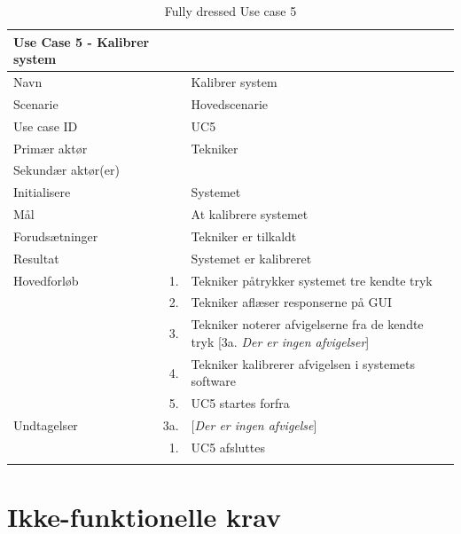 
\begin{longtabu} to 
\toprule
    {\large \textbf{Use Case 5 - Kalibrer system}} && \\
    \toprule
    Navn &&    Kalibrer system\\
    Scenarie &&    Hovedscenarie\\
    Use case ID &&    UC5\\
    Primær aktør &&    Tekniker\\
    Sekundær aktør(er) &&    \\
    Initialisere &&    Systemet\\
    Mål &&    At kalibrere systemet\\
    Forudsætninger &&    Tekniker er tilkaldt\\
    Resultat &&    Systemet er kalibreret\\
    \toprule
    Hovedforløb &    1. &    Tekniker påtrykker systemet tre kendte tryk\\[-1ex]
                &    2. &   Tekniker aflæser responserne på GUI\\[-1ex]
                &    3. &    Tekniker noterer afvigelserne fra de kendte tryk\newline
                             [3a. \textit{Der er ingen afvigelser}]\\[-1ex]
                &    4. &   Tekniker kalibrerer afvigelsen i systemets software\\[-1ex]
               &	5.	&	UC5 startes forfra\\[-1ex]
    \toprule
    Undtagelser &    3a. &    [\textit{Der er ingen afvigelse}]\\[-1ex]
    &	1.	&	UC5 afsluttes\\
                \toprule
\caption{Fully dressed Use case 5}
\label{UC5}
\end{longtabu}
\newpage


\section{Ikke-funktionelle krav}

